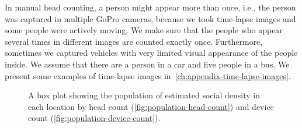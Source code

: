 In manual head counting, a person might appear more than once, i.e., the person was captured in multiple GoPro cameras, because we took time-lapse images and some people were actively moving. We make sure that the people who appear several times in different images are counted exactly once. Furthermore, sometimes we captured vehicles with very limited visual appearance of the people inside. We assume that there are a person in a car and five people in a bus. We present some examples of time-lapse images in~\autoref{ch:appendix-time-lapse-images}.

\begin{figure}[h]
	\begin{adjustwidth}{-2cm}{}
	\centering
	\end{adjustwidth}
	\caption[A box plot of the population]{A box plot showing the population of estimated social density in each location by head count (\ref{fig:population-head-count}) and device count (\ref{fig:population-device-count}).}
	\label{fig:total-population}
\end{figure}

